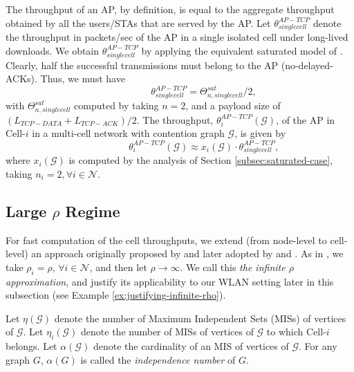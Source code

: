 \documentclass[10pt,a4paper,journal]{IEEEtran}
\theoremstyle{definition}
\theoremstyle{remark}
\theoremstyle{plain}
\begin{document}
The throughput of an AP, by definition, is equal to the aggregate throughput obtained by all the users/STAs that are served by the AP. Let $\theta_{singlecell}^{AP-TCP}$ denote the throughput in packets/sec of the AP in a single isolated cell under long-lived downloads. We obtain $\theta_{singlecell}^{AP-TCP}$ by applying the equivalent saturated model of \cite{wanet.bruno08TCPeqvSatModel}. Clearly, half the successful transmissions must belong to the AP (no-delayed-ACKs). Thus, we must have 
\[\quad \quad \quad \quad \quad \theta_{singlecell}^{AP-TCP} = \Theta_{n,singlecell}^{sat}/2,\] 
with $\Theta_{n,singlecell}^{sat}$ computed by taking $n=2$, and a payload size of $(L_{TCP-DATA}+L_{TCP-ACK})/2$. The throughput, $\theta_i^{AP-TCP}(\mathcal{G})$, of the AP in Cell-$i$ in a multi-cell network with contention graph $\mathcal{G}$, is given by 
\begin{equation}
\label{eqn:theta-i-AP-TCP}
\quad \quad \quad \quad \quad \theta_i^{AP-TCP}(\mathcal{G}) \approx x_i(\mathcal{G}) \cdot \theta_{singlecell}^{AP-TCP}, 
\end{equation}
where $x_i(\mathcal{G})$ is computed by the analysis of Section \ref{subsec:saturated-case}, taking $n_i = 2, \forall i \in \mathcal{N}$. 







\subsection{Large $\rho$ Regime}
\label{subsec:large-rho-regime}

For fast computation of the cell throughputs, we extend (from node-level to cell-level) an approach originally proposed by \cite{wanet.wang-kar05multihop} and later adopted by \cite{wanet.durvy09selfOrganization} and \cite{wanet.liew_etal09ICCback-of-the-envelope}. As in \cite{wanet.wang-kar05multihop}, we take $\rho_i = \rho$, $\forall i \in \mathcal{N}$, and then let $\rho \longrightarrow \infty$. We call this \textit{the infinite $\rho$ approximation}, and justify its applicability to our WLAN setting later in this subsection (see Example \ref{ex:justifying-infinite-rho}). 

Let $\eta(\mathcal{G})$ denote the number of Maximum Independent Sets (MISs) of vertices of $\mathcal{G}$. Let $\eta_i(\mathcal{G})$ denote the number of MISs of vertices of $\mathcal{G}$ to which Cell-$i$ belongs. Let $\alpha(\mathcal{G})$ denote the cardinality of an MIS of vertices of $\mathcal{G}$. For any graph $G$, $\alpha(G)$ is called the \textit{independence number} of $G$. 
\end{document}
